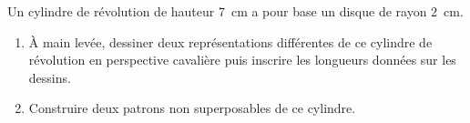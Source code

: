 
\begin{exercice}\label{exo2smath-0300}

    Un cylindre de révolution de hauteur \SI{7}{\centi\meter} a pour base un disque de rayon \SI{2}{\centi\meter}.
\begin{enumerate}
    \item
 À main levée, dessiner deux représentations différentes de ce cylindre de révolution en perspective cavalière puis inscrire les longueurs données sur les dessins.
\item
 Construire deux patrons non superposables de ce cylindre.
\end{enumerate}

\end{exercice}
